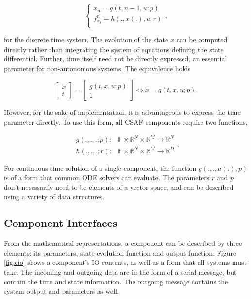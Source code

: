 \begin{equation}
\begin{cases}
x_{n} = g(t, n-1, u; p)\\
f^{n}_{x_0} = h(., x(.), u; r) \\
\end{cases},
\end{equation}

for the discrete time system. The evolution of the state $x$ can be computed directly rather than integrating the system of equations defining the state differential. Further, time itself need not be directly expressed, an essential parameter for non-autonomous systems. The equivalence holds

\begin{equation}
\begin{bmatrix}
\dot x \\
t
\end{bmatrix} = 
\begin{bmatrix}
g(t, x, u; p) \\
1
\end{bmatrix} \iff \dot x = g(t, x, u;p) .
\end{equation}

However, for the sake of implementation, it is advantageous to express the time parameter directly. To use this form, all CSAF components require two functions, 

\begin{equation}
\begin{aligned}
g(.,.,.;p):& \mathbb F \times \mathbb R^N \times \mathbb R^M \rightarrow \mathbb R^N \\
h(.,.,.;r):& \mathbb F \times \mathbb R^N \times \mathbb R^M \rightarrow \mathbb R^D
\end{aligned}.
\end{equation}

For continuous time solution of a single component, the function $g(.,.,u(.);p)$ is of a form that common ODE solvers can evaluate. The parameters $r$ and $p$ don't necessarily need to be elements of a vector space, and can be described using a variety of data structures.

\subsection{Component Interfaces}

From the mathematical representations, a component can be described by three elements: its parameters, state evolution function and output function. Figure \ref{fig:cio} shows a component's IO contents, as well as a form that all systems must take. The incoming and outgoing data are in the form of a serial message, but contain the time and state information. The outgoing message contains the system output and parameters as well.

